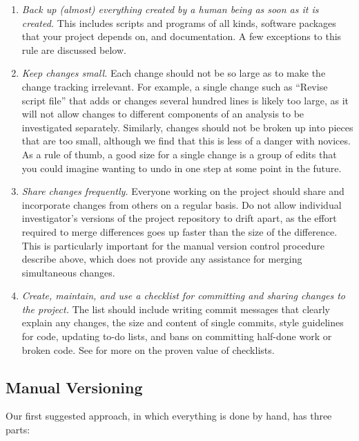 \documentclass[10pt]{article}
\newcommand{\recommend}[1]{\textit{#1}}
\begin{document}
\begin{enumerate}

\item
  \recommend{Back up (almost) everything created by a human being as
    soon as it is created.} This includes scripts and programs of all
  kinds, software packages that your project depends on, and
  documentation. A few exceptions to this rule are discussed below.

\item
  \recommend{Keep changes small.}  Each change should not be so large
  as to make the change tracking irrelevant. For example, a single
  change such as ``Revise script file'' that adds or changes several
  hundred lines is likely too large, as it will not allow changes to
  different components of an analysis to be investigated
  separately. Similarly, changes should not be broken up into pieces
  that are too small, although we find that this is less of a danger
  with novices. As a rule of thumb, a good size for a single change is
  a group of edits that you could imagine wanting to undo in one step
  at some point in the future.

\item
  \recommend{Share changes frequently.} Everyone working on the project 
  should share and incorporate changes from others on a regular basis.
  Do not allow individual investigator's versions of the
  project repository to drift apart, as the effort required to merge
  differences goes up faster than the size of the difference. This is
  particularly important for the manual version control procedure
  describe above, which does not provide any assistance for merging
  simultaneous changes.

\item
  \recommend{Create, maintain, and use a checklist for committing and
    sharing changes to the project.}  The list should include
  writing commit messages that clearly explain any changes,
  the size and content of single commits,
  style guidelines for code,
  updating to-do lists,
  and bans on committing half-done work or broken code.
  See \cite{gawande2011} for more on the proven value of checklists.

\end{enumerate}

\subsection*{Manual Versioning}

Our first suggested approach, in which everything is done by hand, has
three parts:
\end{document}
